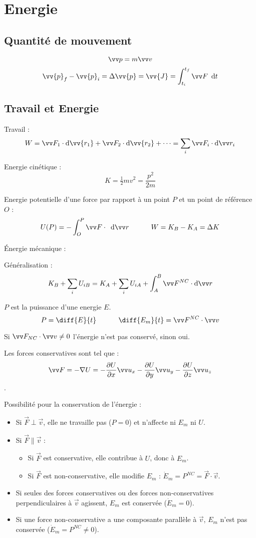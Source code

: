 \documentclass[../main.tex]{subfiles}
\begin{document}
\section{Energie}
\subsection{Quantité de mouvement}
\[
  \qm=m\vi
\]
\[
  \vv{p}_f - \vv{p}_i = \Delta\vv{p} = \vv{J} = \int_{t_i}^{t_f}\F\dee{t}
\]

\subsection{Travail et Energie}

Travail : 
\[
  W= \F_1\cdot\mathrm{d}\vv{r_1} + \F_2\cdot\mathrm{d}\vv{r_2} + \dots =\sum_i \F_i\cdot\mathrm{d}\pos_i
\]

Energie cinétique :
\[
  K = \tfrac{1}{2}mv^2 = \frac{p^2}{2m}
\]

Energie potentielle d'une force \F{} par rapport à un point \(P\) et un point de référence \(O\) : 
\[
  U(P)=-\int_O^P\F\cdot\dee{\pos}\phantom{texttex} W = K_B - K_A = \Delta K
\]

Énergie mécanique :

Généralisation : 
\[
  K_B + \sum_i U_{iB} = K_A + \sum_i U_{iA} + \int_A^B \F^{NC}\cdot\mathrm{d}\pos
\]

\(P\) est la puissance d'une energie \(E\). 
\[
  P = \diff{E}{t} \phantom{textext} \diff{E_m}{t} = \F^{NC}\cdot\vi
\]

Si \(\F_{NC}\cdot\vi \neq 0 \) l'énergie n'est pas conservé, sinon oui. 

Les forces conservatives sont tel que :
\[
  \F=-\nabla U=-\frac{\partial U}{\partial x}\ux-\frac{\partial U}{\partial y}\uy-\frac{\partial U}{\partial z}\uz
\].

Possibilité pour la conservation de l'énergie : 
\begin{itemize}
  \item Si \(\vec{F} \perp \vec{v}\), elle ne travaille pas (\(P = 0\)) et n'affecte ni \(E_m\) ni \(U\).
  \item Si \(\vec{F} \parallel \vec{v}\) :
    \begin{itemize}
      \item Si \(\vec{F}\) est conservative, elle contribue à \(U\), donc à \(E_m\).
      \item Si \(\vec{F}\) est non-conservative, elle modifie \(E_m\) : \(\dot{E}_m = P^{NC} = \vec{F} \cdot \vec{v}\).
    \end{itemize}
  \item Si seules des forces conservatives ou des forces non-conservatives perpendiculaires à \(\vec{v}\) agissent, \(E_m\) est conservée (\(\dot{E}_m = 0\)).
  \item Si une force non-conservative a une composante parallèle à \(\vec{v}\), \(E_m\) n'est pas conservée (\(\dot{E}_m = P^{NC} \neq 0\)).
\end{itemize}
\end{document}
